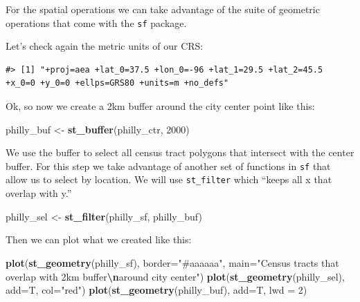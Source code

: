 \documentclass[
]{book}
\newenvironment{Shaded}{\begin{snugshade}}{\end{snugshade}}
\newcommand{\AttributeTok}[1]{\textcolor[rgb]{0.13,0.29,0.53}{#1}}
\newcommand{\DecValTok}[1]{\textcolor[rgb]{0.00,0.00,0.81}{#1}}
\newcommand{\FunctionTok}[1]{\textcolor[rgb]{0.13,0.29,0.53}{\textbf{#1}}}
\newcommand{\NormalTok}[1]{#1}
\newcommand{\OtherTok}[1]{\textcolor[rgb]{0.56,0.35,0.01}{#1}}
\newcommand{\SpecialCharTok}[1]{\textcolor[rgb]{0.81,0.36,0.00}{\textbf{#1}}}
\newcommand{\StringTok}[1]{\textcolor[rgb]{0.31,0.60,0.02}{#1}}
\begin{document}
For the spatial operations we can take advantage of the suite of geometric operations that come with the \texttt{sf} package.

Let's check again the metric units of our CRS:

\begin{Shaded}
\end{Shaded}

\begin{verbatim}
#> [1] "+proj=aea +lat_0=37.5 +lon_0=-96 +lat_1=29.5 +lat_2=45.5 +x_0=0 +y_0=0 +ellps=GRS80 +units=m +no_defs"
\end{verbatim}

Ok, so now we create a 2km buffer around the city center point like this:

\begin{Shaded}
\begin{Highlighting}[]
\NormalTok{philly\_buf }\OtherTok{\textless{}{-}} \FunctionTok{st\_buffer}\NormalTok{(philly\_ctr, }\DecValTok{2000}\NormalTok{)}
\end{Highlighting}
\end{Shaded}

We use the buffer to select all census tract polygons that intersect with the center buffer. For this step we take advantage of another set of functions in \texttt{sf} that allow us to select by location. We will use \texttt{st\_filter} which ``keeps all x that overlap with y.''

\begin{Shaded}
\begin{Highlighting}[]
\NormalTok{philly\_sel }\OtherTok{\textless{}{-}} \FunctionTok{st\_filter}\NormalTok{(philly\_sf, philly\_buf)}
\end{Highlighting}
\end{Shaded}

Then we can plot what we created like this:

\begin{Shaded}
\begin{Highlighting}[]
\FunctionTok{plot}\NormalTok{(}\FunctionTok{st\_geometry}\NormalTok{(philly\_sf), }\AttributeTok{border=}\StringTok{"\#aaaaaa"}\NormalTok{, }\AttributeTok{main=}\StringTok{"Census tracts that overlap with 2km buffer}\SpecialCharTok{\textbackslash{}n}\StringTok{around city center"}\NormalTok{)}
\FunctionTok{plot}\NormalTok{(}\FunctionTok{st\_geometry}\NormalTok{(philly\_sel), }\AttributeTok{add=}\NormalTok{T, }\AttributeTok{col=}\StringTok{"red"}\NormalTok{)}
\FunctionTok{plot}\NormalTok{(}\FunctionTok{st\_geometry}\NormalTok{(philly\_buf), }\AttributeTok{add=}\NormalTok{T, }\AttributeTok{lwd =} \DecValTok{2}\NormalTok{)}
\end{Highlighting}
\end{Shaded}
\end{document}
